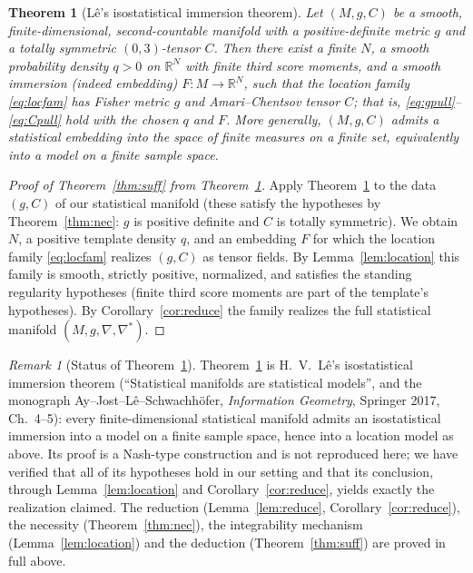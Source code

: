 \documentclass{amsart}
\newtheorem{theorem}{Theorem}
\theoremstyle{definition}
\theoremstyle{remark}
\newtheorem{remark}{Remark}
\begin{document}
\begin{theorem}[Lê's isostatistical immersion theorem]\label{thm:Le}
Let $(M,g,C)$ be a smooth, finite-dimensional, second-countable manifold with a
positive-definite metric $g$ and a totally symmetric $(0,3)$-tensor $C$. Then
there exist a finite $N$, a smooth probability density $q>0$ on $\mathbb R^{N}$
with finite third score moments, and a smooth immersion (indeed embedding)
$F\colon M\to\mathbb R^{N}$, such that the location family
\eqref{eq:locfam} has Fisher metric $g$ and Amari--Chentsov tensor $C$; that is,
\eqref{eq:gpull}--\eqref{eq:Cpull} hold with the chosen $q$ and $F$. More
generally, $(M,g,C)$ admits a statistical embedding into the space of finite
measures on a finite set, equivalently into a model on a finite sample space.
\end{theorem}

\begin{proof}[Proof of Theorem~\ref{thm:suff} from Theorem~\ref{thm:Le}]
Apply Theorem~\ref{thm:Le} to the data $(g,C)$ of our statistical manifold (these
satisfy the hypotheses by Theorem~\ref{thm:nec}: $g$ is positive definite and
$C$ is totally symmetric). We obtain $N$, a positive template density $q$, and an
embedding $F$ for which the location family \eqref{eq:locfam} realizes $(g,C)$ as
tensor fields. By Lemma~\ref{lem:location} this family is smooth, strictly
positive, normalized, and satisfies the standing regularity hypotheses (finite
third score moments are part of the template's hypotheses). By
Corollary~\ref{cor:reduce} the family realizes the full statistical manifold
$(M,g,\nabla,\nabla^{*})$.
\end{proof}

\begin{remark}[Status of Theorem~\ref{thm:Le}]
Theorem~\ref{thm:Le} is H.~V.~L\^e's isostatistical immersion theorem
(``Statistical manifolds are statistical models'', and the monograph
Ay--Jost--L\^e--Schwachh\"ofer, \emph{Information Geometry}, Springer 2017,
Ch.~4--5): every finite-dimensional statistical manifold admits an isostatistical
immersion into a model on a finite sample space, hence into a location model as
above. Its proof is a Nash-type construction and is not reproduced here; we have
verified that all of its hypotheses hold in our setting and that its conclusion,
through Lemma~\ref{lem:location} and Corollary~\ref{cor:reduce}, yields exactly
the realization claimed. The reduction (Lemma~\ref{lem:reduce},
Corollary~\ref{cor:reduce}), the necessity (Theorem~\ref{thm:nec}), the
integrability mechanism (Lemma~\ref{lem:location}) and the deduction
(Theorem~\ref{thm:suff}) are proved in full above.
\end{remark}
\end{document}
